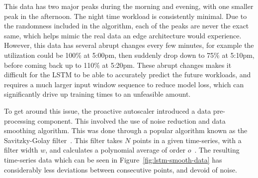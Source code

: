 This data has two major peaks during the morning and evening, with one smaller peak in the afternoon. The night time workload is consistently minimal. Due to the randomness included in the algorithm, each of the peaks are never the exact same, which helps mimic the real data an edge architecture would experience. However, this data has several abrupt changes every few minutes, for example the utilization could be 100\% at 5:00pm, then suddenly drop down to 75\% at 5:10pm, before coming back up to 110\% at 5:20pm. These abrupt changes makes it difficult for the LSTM to be able to accurately predict the future workloads, and requires a much larger input window sequence to reduce model loss, which can significantly drive up training times to an unfeasible amount.\par

To get around this issue, the proactive autoscaler introduced a data pre-processing component. This involved the use of noise reduction and data smoothing algorithm. This was done through a popular algorithm known as the Savitzky-Golay filter~\cite{savitzky1964smoothing}. This filter takes $N$ points in a given time-series, with a filter width $w$, and calculates a polynomial average of order $o$~\cite{schafer2011savitzky}. The resulting time-series data which can be seen in Figure~\ref{fig:lstm-smooth-data} has considerably less deviations between consecutive points, and devoid of noise.\par

\begin{center}
\begin{minipage}{\linewidth}
    \label{fig:lstm-smooth-data}
\end{minipage}
\end{center}

